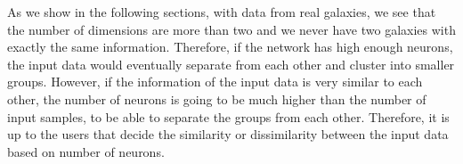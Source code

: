 As we show in the following sections, with data from real galaxies, we see that the number of dimensions are more than two and we never have two galaxies with exactly the same information. 
Therefore, if the network has high enough neurons, the input data would eventually separate from each other and cluster into smaller groups. 
However, if the information of the input data is very similar to each other, the number of neurons is going to be much higher than the number of input samples, to be able to separate the groups from each other. 
Therefore, it is up to the users that decide the similarity or dissimilarity between the input data based on number of neurons. 
